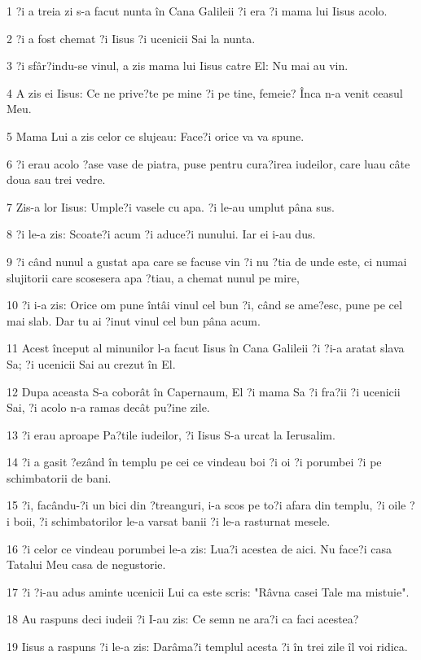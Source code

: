 \par 1 ?i a treia zi s-a facut nunta în Cana Galileii ?i era ?i mama lui Iisus acolo.
\par 2 ?i a fost chemat ?i Iisus ?i ucenicii Sai la nunta.
\par 3 ?i sfâr?indu-se vinul, a zis mama lui Iisus catre El: Nu mai au vin.
\par 4 A zis ei Iisus: Ce ne prive?te pe mine ?i pe tine, femeie? Înca n-a venit ceasul Meu.
\par 5 Mama Lui a zis celor ce slujeau: Face?i orice va va spune.
\par 6 ?i erau acolo ?ase vase de piatra, puse pentru cura?irea iudeilor, care luau câte doua sau trei vedre.
\par 7 Zis-a lor Iisus: Umple?i vasele cu apa. ?i le-au umplut pâna sus.
\par 8 ?i le-a zis: Scoate?i acum ?i aduce?i nunului. Iar ei i-au dus.
\par 9 ?i când nunul a gustat apa care se facuse vin ?i nu ?tia de unde este, ci numai slujitorii care scosesera apa ?tiau, a chemat nunul pe mire,
\par 10 ?i i-a zis: Orice om pune întâi vinul cel bun ?i, când se ame?esc, pune pe cel mai slab. Dar tu ai ?inut vinul cel bun pâna acum.
\par 11 Acest început al minunilor l-a facut Iisus în Cana Galileii ?i ?i-a aratat slava Sa; ?i ucenicii Sai au crezut în El.
\par 12 Dupa aceasta S-a coborât în Capernaum, El ?i mama Sa ?i fra?ii ?i ucenicii Sai, ?i acolo n-a ramas decât pu?ine zile.
\par 13 ?i erau aproape Pa?tile iudeilor, ?i Iisus S-a urcat la Ierusalim.
\par 14 ?i a gasit ?ezând în templu pe cei ce vindeau boi ?i oi ?i porumbei ?i pe schimbatorii de bani.
\par 15 ?i, facându-?i un bici din ?treanguri, i-a scos pe to?i afara din templu, ?i oile ?i boii, ?i schimbatorilor le-a varsat banii ?i le-a rasturnat mesele.
\par 16 ?i celor ce vindeau porumbei le-a zis: Lua?i acestea de aici. Nu face?i casa Tatalui Meu casa de negustorie.
\par 17 ?i ?i-au adus aminte ucenicii Lui ca este scris: "Râvna casei Tale ma mistuie".
\par 18 Au raspuns deci iudeii ?i I-au zis: Ce semn ne ara?i ca faci acestea?
\par 19 Iisus a raspuns ?i le-a zis: Darâma?i templul acesta ?i în trei zile îl voi ridica.
